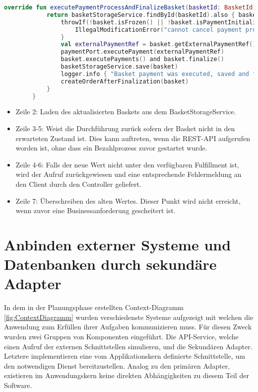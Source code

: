 \begin{minipage}{\linewidth} %
	\begin{lstlisting}[caption={Setzen der Fulfillment Methode im Basket Aggregate}, label={lst:domainservice}, language=Kotlin]
		override fun executePaymentProcessAndFinalizeBasket(basketId: BasketId): Basket {
			return basketStorageService.findById(basketId).also { basket ->
				throwIf(!basket.isFrozen() || !basket.isPaymentInitialized()) {
					IllegalModificationError("cannot cancel payment progress if it is not initialized")
				}
				val externalPaymentRef = basket.getExternalPaymentRef()
				paymentPort.executePayment(externalPaymentRef)
				basket.executePayments() and basket.finalize()
				basketStorageService.save(basket)
				logger.info { "Basket payment was executed, saved and finalized" }
				createOrderAfterFinalization(basket)
			}
		}
	\end{lstlisting}
\end{minipage}

\begin{itemize}[noitemsep,nolistsep]
	\item Zeile 2: Laden des aktualisierten Baskets aus dem BasketStorageService.
	\item Zeile 3-5: Weist die Durchführung zurück sofern der Basket nicht in den erwarteten Zustand ist. Dies kann auftreten, wenn die REST-API aufgerufen worden ist, ohne dass ein Bezahlprozess zuvor gestartet wurde.
	\item Zeile 4-6: Falls der neue Wert nicht unter den verfügbaren Fulfillment ist, wird der Aufruf zurückgewiesen und eine entsprechende Fehlermeldung an den Client durch den Controller geliefert.
	\item Zeile 7: Überschreiben des alten Wertes. Dieser Punkt wird nicht erreicht, wenn zuvor eine Businessanforderung gescheitert ist.
\end{itemize}

\section{Anbinden externer Systeme und Datenbanken durch sekundäre Adapter}

In dem in der Planungsphase erstellten Context-Diagramm \ref{fig:ContextDiagramm} wurden verschiedenste Systeme aufgezeigt mit welchen die Anwendung zum Erfüllen ihrer Aufgaben kommunizieren muss. Für diesen Zweck wurden zwei Gruppen von Komponenten eingeführt. Die API-Service, welche einen Aufruf der externen Schnittstellen simulieren, und die Sekundären Adapter. Letztere implementieren eine vom Applikationskern definierte Schnittstelle, um den notwendigen Dienst bereitzustellen. Analog zu den primären Adapter, existieren im Anwendungskern keine direkten Abhängigkeiten zu diesem Teil der Software.


